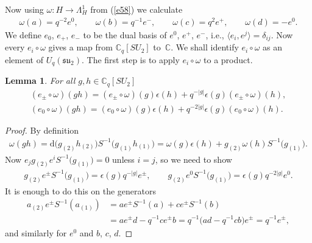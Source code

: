 \documentclass[10pt,a4paper]{amsart}
\numberwithin{equation}{section}
\newtheorem{Lemma}[Theorem]{Lemma}
\newcommand{\extd}{\mathrm{d}}
\newcommand{\C}{\mathbb{C}}
\newcommand{\<}{\langle}
\renewcommand{\>}{\rangle}
\begin{document}
Now using $ \omega\colon H\rightarrow \Lambda_{H}^{1} $ from (\ref{e58}) we calculate
\begin{gather} \label{e59}
\omega(a)= q^{-2}e^{0}, \qquad \omega(b) =q^{-1}e^{-}, \qquad \omega(c) = q^{2}e^{+}, \qquad \omega(d) = - e^{0}.
\end{gather}
We define $ e_{0}$, $e_{+}$, $e_{-} $ to be the dual basis of $ e^{0}$, $e^{+}$, $e^{-} $, i.e., $ \langle e_{i}, e^{j}\rangle= \delta_{ij} $. Now every $ e_{i}\circ \omega $ gives a map from $ \C_{q}[SU_{2}]$ to~$ \C $. We shall identify $ e_{i}\circ \omega $ as an element of $ U_{q}({\mathfrak{su}}_{2})$. The first step is to apply $ e_{i}\circ \omega $ to a product.
\begin{Lemma}\label{L1}
		For all $ g,h \in \C_{q}[SU_{2}] $
		\begin{gather*}
		(e_{\pm} \circ \omega)(g h) = (e_{\pm} \circ \omega)(g) \epsilon (h)+q^{-|g|} \epsilon (g) (e_{\pm} \circ\omega)(h),\\
		(e_{0} \circ \omega)(g h) = (e_{0} \circ \omega)(g) \epsilon (h)+q^{-2|g|} \epsilon (g) (e_{0} \circ\omega)(h).
	\end{gather*}
\end{Lemma}
\begin{proof}
	By definition
	\begin{gather*}
	\omega (g h)= \extd \big(g_{(2)} h_{(2)}\big) S^{-1} \big(g_{(1)} h_{(1)}\big)=\omega(g)\epsilon(h)+g_{(2)} \omega (h) S^{-1}\big(g_{(1)}\big).
	\end{gather*}
	Now $ e_{j} g_{(2)} e^{i} S^{-1}\big(g_{(1)}\big)=0$ unless $ i=j $, so we need to show
	\begin{gather*}
	g_{(2)} e^{\pm} S^{-1} \big(g_{(1)}\big)=\epsilon (g) q^{-|g|}e^{\pm}, \qquad g_{(2)} e^{0} S^{-1} \big(g_{(1)}\big)=\epsilon (g) q^{-2|g|}e^{0}.
	\end{gather*}
	It is enough to do this on the generators
	\begin{align*}
	a_{(2)}e^{\pm} S^{-1} (a_{(1)})&= a e^{\pm} S^{-1} (a) + c e^{\pm} S^{-1} (b)\\
	&= a e^{\pm} d-q^{-1} ce^{\pm}b=q^{-1} \big(ad-q^{-1}cb\big)e^{\pm}=q^{-1}e^{\pm},
	\end{align*}
	and similarly for $ e^{0} $ and $ b$, $c$, $d $.
\end{proof}
\end{document}
